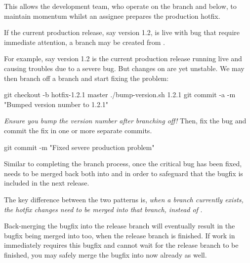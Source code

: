 This allows the development team, who operate on the  branch and below, to maintain momentum whilst an assignee prepares the production hotfix. \newline

If the current production release, say version 1.2, is live with bug that require immediate attention, a  branch may be created from .

For example, say version 1.2 is the current production release running live and causing troubles due to a severe bug. But changes on  are yet unstable. We may then branch off a  branch and start fixing the problem:

\begin{git-bash}
    git checkout -b hotfix-1.2.1 master
    ./bump-version.sh 1.2.1
    git commit -a -m "Bumped version number to 1.2.1"
\end{git-bash}

\emph{Ensure you bump the version number after branching off!} Then, fix the bug and commit the fix in one or more separate commits.

\begin{git-bash}
    git commit -m "Fixed severe production problem"
\end{git-bash}

Similar to completing the  branch process, once the critical bug has been fixed,  needs to be merged back both into  and  in order to safeguard that the bugfix is included in the next release.

The key difference between the two patterns is, \emph{when a  branch currently exists, the hotfix changes need to be merged into that  branch, instead of }.

Back-merging the bugfix into the release branch will eventually result in the bugfix being merged into  too, when the release branch is finished. If work in  immediately requires this bugfix and cannot wait for the release branch to be finished, you may safely merge the bugfix into  now already as well.

